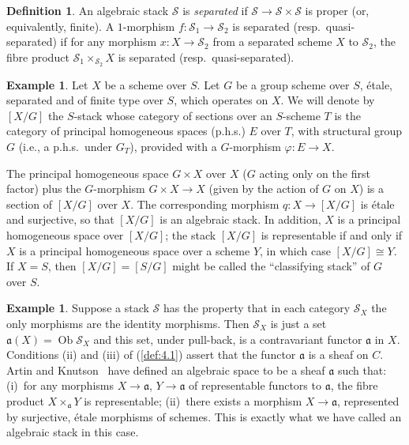 \documentclass[10pt]{amsart}
\theoremstyle{plain}
\theoremstyle{definition}
\newtheorem{definition}[theorem]{Definition}
\newtheorem{example}[theorem]{Example}
\DeclareMathOperator{\Ob}{Ob}
\begin{document}
\begin{definition}\label{def:4.7}
An algebraic stack $\mathscr{S}$ is \emph{separated} if $\mathscr{S} \to \mathscr{S} \times \mathscr{S}$ is proper (or, equivalently, finite). A $1$-morphism $f: \mathscr{S}_1 \to \mathscr{S}_2$ is separated (resp.~quasi-separated) if for any morphism $x: X \to \mathscr{S}_2$ from a separated scheme $X$ to $\mathscr{S}_2$, the fibre product $\mathscr{S}_1 \times_{\mathscr{S}_2} X$ is separated (resp.~quasi-separated).
\end{definition}

\begin{example}\label{ex:4.8}
Let $X$ be a scheme over $S$. Let $G$ be a group scheme over $S$, \'etale, separated and of finite type over $S$, which operates on $X$. We will denote by $[X/G]$ the $S$-stack whose category of sections over an $S$-scheme $T$ is the category of principal homogeneous spaces (p.h.s.) $E$ over $T$, with structural group $G$ (i.e., a p.h.s.~under $G_T$), provided with a $G$-morphism $\varphi: E \to X$.

The principal homogeneous space $G \times X$ over $X$ ($G$ acting only on the first factor) plus the $G$-morphism $G \times X \to X$ (given by the action of $G$ on $X$) is a section of $[X/G]$ over $X$. The corresponding morphism $q: X \to [X/G]$ is \'etale and surjective, so that $[X/G]$ is an algebraic stack. In addition, $X$ is a principal homogeneous space over $[X/G]$; the stack $[X/G]$ is representable if and only if $X$ is a principal homogeneous space over a scheme $Y$, in which case $[X/G] \cong Y$. If $X = S$, then $[X/G] = [S/G]$ might be called the ``classifying stack'' of $G$ over $S$.
\end{example}

\begin{example}\label{ex:4.9}
Suppose a stack $\mathscr{S}$ has the property that in each category $\mathscr{S}_X$ the only morphisms are the identity morphisms. Then $\mathscr{S}_X$ is just a set $\mathfrak{a}(X) = \Ob \mathscr{S}_X$ and this set, under pull-back, is a contravariant functor $\mathfrak{a}$ in $X$. Conditions (ii) and (iii) of (\ref{def:4.1}) assert that the functor $\mathfrak{a}$ is a sheaf on $C$. Artin and Knutson~\cite{K} have defined an algebraic space to be a sheaf $\mathfrak{a}$ such that: (i)~for any morphisms $X \to \mathfrak{a}$, $Y \to \mathfrak{a}$ of representable functors to $\mathfrak{a}$, the fibre product $X \times_{\mathfrak{a}} Y$ is representable; (ii)~there exists a morphism $X \to \mathfrak{a}$, represented by surjective, \'etale morphisms of schemes. This is exactly what we have called an algebraic stack in this case.
\end{example}
\end{document}
